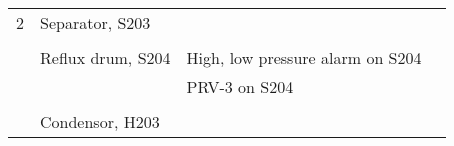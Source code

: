 \begin{table}[p]
\begin{tabularx}{\linewidth}{@{}lp{2cm}XX@{}}
2   & Separator, S203           &                                                                                                                                                               &                                                                                                                                                                                                              \\ \cmidrule(l){3-4} 
    &                           &                                                                                                                                                               &                                                                                                                                                                                                              \\ \cmidrule(l){2-4} 
    & Reflux drum, S204         & High, low pressure alarm on S204                                                                                                                              &                                                                                                                                                                                                              \\ \cmidrule(l){3-4} 
    &                           & PRV-3 on S204                                                                                                                                                 &                                                                                                                                                                                                              \\ \cmidrule(l){3-4} 
    &                           &                                                                                                                                                               &                                                                                                                                                                                                              \\ \cmidrule(l){2-4} 
    & Condensor, H203           &                                                                                                                                                               &                                                                                                                                                                                                              \\ \cmidrule(l){3-4} 

\end{tabularx}
\end{table}
